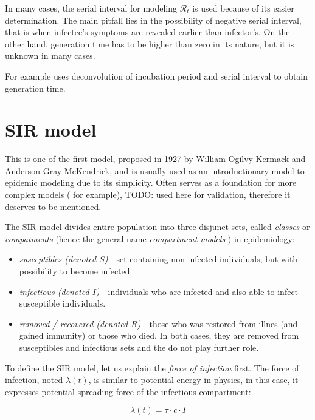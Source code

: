 \documentclass[
  digital, %
  table,   %
  twoside, %
  12pt,
  lof,     %
  lot,     %
]{fithesis3}
\begin{document}
In many cases, the serial interval for modeling $\mathcal{R}_t$ 
is used because of its easier determination. 
The main pitfall lies in the possibility of negative serial 
interval, that is when infectee's symptoms are revealed 
earlier than infector's. 
On the other hand, generation time has to be higher than 
zero in its nature, but it is unknown in many cases. 

For example \cite{knight2020} uses deconvolution of incubation 
period and serial interval to obtain generation time.


\section{SIR model}

This is one of the first model, proposed in 1927 by 
William Ogilvy Kermack and Anderson Gray McKendrick, and is 
usually used as an introductionary model to epidemic 
modeling \cite{martcheva2015} due to its simplicity. 
Often serves as a foundation for more complex 
models (\cite{clancy2008} for example), TODO: used here for validation, therefore it deserves to be 
mentioned.

The SIR model divides entire population into three disjunct 
sets, called \textit{classes} or \textit{compatments} (hence the general 
name \textit{compartment models} \cite{bacaer2011}) in epidemiology:

\begin{itemize}
  \item \textit{susceptibles (denoted $S$)} - set containing non-infected individuals, but with possibility to become infected.
  \item \textit{infectious (denoted $I$)} - individuals who are infected and also able to infect susceptible individuals.
  \item \textit{removed / recovered (denoted $R$)} - those who was restored from illnes (and gained immunity) or those who died. In both cases, they are removed from susceptibles and infectious sets and the do not play further role.
\end{itemize}

To define the SIR model, let us explain the \textit{force of infection} first.
The force of infection, noted $\lambda(t)$, is similar to 
potential energy in physics, in this case, it expresses 
potential spreading force of the infectious compartment:

\begin{equation}
	\lambda(t) = \tau \cdot \bar{c} \cdot I
\end{equation}
\end{document}
